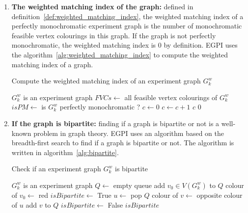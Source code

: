 \begin{enumerate}
    \item \textbf{The weighted matching index of the graph:} defined in definition~\ref{def:weighted_matching_index}, the weighted matching index of a perfectly monochromatic experiment graph is the number of monochromatic feasible vertex colourings in this graph.
        If the graph is not perfectly monochromatic, the weighted matching index is $0$ by definition.
        EGPI uses the algorithm~\ref{alg:weighted_matching_index} to compute the weighted matching index of a graph.
        \begin{algorithm}
            \caption{Compute the weighted matching index of an experiment graph $G_k^w$}
            \label{alg:weighted_matching_index}
            \begin{algorithmic}
                \Require $G_k^w$ is an experiment graph
                \State $FVCs \gets$ all feasible vertex colourings of $G_k^w$
                \State $isPM \gets$ is $G_k^w$ perfectly monochromatic ?
                    \State $c \gets 0$
                            \State $c \gets c + 1$
                        \EndIf
                    \EndFor
                    \State \Return $c$
                \Else
                    \State \Return $0$
                \EndIf
            \end{algorithmic}
        \end{algorithm}

    \item \textbf{If the graph is bipartite:} finding if a graph is bipartite or not is a well-known problem in graph theory.
        EGPI uses an algorithm based on the breadth-first search to find if a graph is bipartite or not.
        The algorithm is written in algorithm~\ref{alg:bipartite}.
        \begin{algorithm}
            \caption{Check if an experiment graph $G_k^w$ is bipartite}
            \label{alg:bipartite}
            \begin{algorithmic}
                \Require $G_k^w$ is an experiment graph
                \State $Q \gets$ empty queue
                \State add $v_0 \in V(G_k^w)$ to $Q$
                \State colour of $v_0 \gets$ red
                \State $isBipartite \gets$ True
                    \State $u \gets$ pop $Q$
                            \State colour of $v \gets$ opposite colour of $u$
                            \State add $v$ to $Q$
                            \State $isBipartite \gets$ False
                        \EndIf
                    \EndFor
                \EndWhile
                \State \Return $isBipartite$
            \end{algorithmic}
        \end{algorithm}


\end{enumerate}
